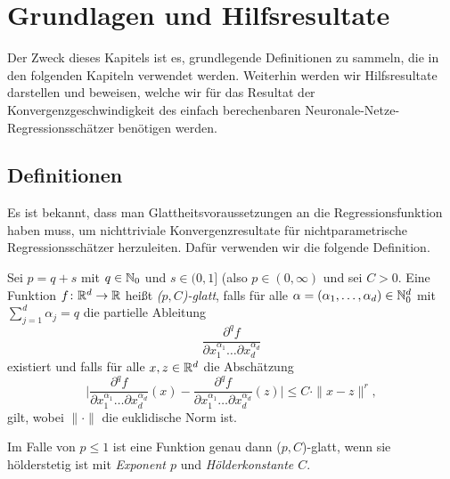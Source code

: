 \chapter{Grundlagen und Hilfsresultate}
\label{chap:1}

Der Zweck dieses Kapitels ist es, grundlegende Definitionen zu sammeln, die in den folgenden Kapiteln verwendet werden. Weiterhin werden wir Hilfsresultate darstellen und beweisen, welche wir für das Resultat der Konvergenzgeschwindigkeit des einfach berechenbaren Neuronale-Netze-Regressionsschätzer benötigen werden.

\section{Definitionen}
Es ist bekannt, dass man Glattheitsvoraussetzungen an die Regressionsfunktion haben muss, um nichttriviale Konvergenzresultate für nichtparametrische Regressionsschätzer herzuleiten. Dafür verwenden wir die folgende Definition.
\begin{defn}[($p,C$)-Glattheit]
\label{def:pc}
   Sei $p = q + s$ mit $q \in \mathbb{N}_0$ und $s \in (0,1]$ (also $p \in (0, \infty)$ und sei $C > 0$. Eine Funktion $f\colon \mathbb{R}^d \to \mathbb{R}$ heißt \emph{($p, C$)-glatt}, falls für alle $\alpha = (\alpha_1,\dots,\alpha_d) \in \mathbb{N}_0^d$ mit $\sum_{j = 1}^{d}\alpha_j = q$ die partielle Ableitung 
   $$ \frac{\partial^qf}{\partial x_1^{\alpha_1}\dots\partial x_d^{\alpha_d}}$$
   existiert und falls für alle $x, z \in \mathbb{R}^d$ die Abschätzung 
   $$ \bigg|\frac{\partial^qf}{\partial x_1^{\alpha_1}\dots\partial x_d^{\alpha_d}}(x) - \frac{\partial^qf}{\partial x_1^{\alpha_1}\dots\partial x_d^{\alpha_d}}(z) \bigg| \leq C \cdot \|x - z\|^r,$$
   gilt, wobei $\|\cdot\|$ die euklidische Norm ist.  
\end{defn}
\begin{bemnumber}
Im Falle von $p \leq 1$ ist eine Funktion genau dann ($p, C$)-glatt, wenn sie hölderstetig ist mit \emph{Exponent $p$} und \emph{Hölderkonstante $C$}.
\end{bemnumber}

